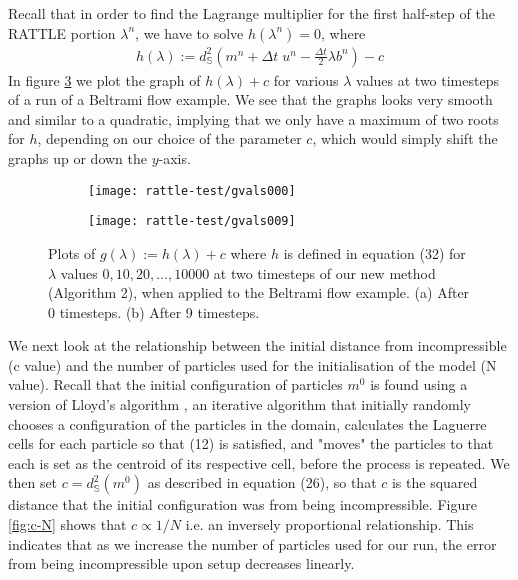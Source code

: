 \documentclass[11pt, oneside]{article}   	%
\newcommand{\dt}{\Delta t}
\newcommand{\Sb}{\mathbb{S}}
\begin{document}
Recall that in order to find the Lagrange multiplier for the first half-step of the RATTLE portion \(\lambda^n\), we have to solve \(h(\lambda^n) = 0\), where
\begin{align}
 h(\lambda) := d^{2}_{\Sb}(m^n + \dt \; u^n - \frac{\dt}{2} \lambda b^n) - c
\end{align}
In figure \ref{fig:g-lambda} we plot the graph of \(h(\lambda) + c\) for various \(\lambda\) values at two timesteps of a run of a Beltrami flow example. We see that the graphs looks very smooth and similar to a quadratic, implying that we only have a maximum of two roots for \(h\), depending on our choice of the parameter \(c\), which would simply shift the graphs up or down the \(y\)-axis.

\begin{figure}[H]
   \begin{subfigure}[t]{0.4\textwidth}
        \centering
	\texttt{[image: rattle-test/gvals000]}
        \caption{} \label{fig:g-lambda-000}
    \end{subfigure}
    \begin{subfigure}[t]{0.4\textwidth}
        \centering
	\texttt{[image: rattle-test/gvals009]}
        \caption{} \label{fig:g-lambda-009}
    \end{subfigure}
\centering
\caption{Plots of \(g(\lambda) := h(\lambda) + c\) where \(h\) is defined in equation (32) for \(\lambda\) values \(0, 10, 20, \dots,10000\) at two timesteps of our new method (Algorithm 2), when applied to the Beltrami flow example. (a) After 0 timesteps. (b) After 9 timesteps.}
\centering
\label{fig:g-lambda}
\end{figure}

We next look at the relationship between the initial distance from incompressible (c value) and the number of particles used for the initialisation of the model (N value). Recall that the initial configuration of particles \(m^0\) is found using a version of Lloyd's algorithm \citep{merigot2017algorithm}, an iterative algorithm that initially randomly chooses a configuration of the particles in the domain, calculates the Laguerre cells for each particle so that (12) is satisfied, and "moves" the particles to that each is set as the centroid of its respective cell, before the process is repeated. We then set \(c = d^{2}_{\mathbb{S}}(m^{0})\) as described in equation (26), so that \(c\) is the squared distance that the initial configuration was from being incompressible. Figure \ref{fig:c-N} shows that \(c \propto 1/N\) i.e. an inversely proportional relationship. This indicates that as we increase the number of particles used for our run, the error from being incompressible upon setup decreases linearly.
\end{document}
